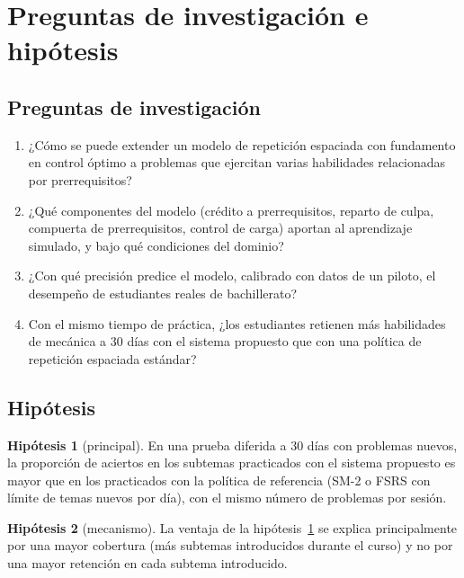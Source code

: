\documentclass[12pt]{article}
\theoremstyle{definition}
\newtheorem{hipotesis}{Hipótesis}
\begin{document}
\section{Preguntas de investigación e hipótesis}
\label{sec:preguntas}

\subsection{Preguntas de investigación}

\begin{enumerate}[label=P\arabic*.]
\item ¿Cómo se puede extender un modelo de repetición espaciada con fundamento en control óptimo \citep{tabibian2019} a problemas que ejercitan varias habilidades relacionadas por prerrequisitos?
\item ¿Qué componentes del modelo (crédito a prerrequisitos, reparto de culpa, compuerta de prerrequisitos, control de carga) aportan al aprendizaje simulado, y bajo qué condiciones del dominio?
\item ¿Con qué precisión predice el modelo, calibrado con datos de un piloto, el desempeño de estudiantes reales de bachillerato?
\item Con el mismo tiempo de práctica, ¿los estudiantes retienen más habilidades de mecánica a 30 días con el sistema propuesto que con una política de repetición espaciada estándar?
\end{enumerate}

\subsection{Hipótesis}

\begin{hipotesis}[principal]
\label{h:principal}
En una prueba diferida a 30 días con problemas nuevos, la proporción de aciertos en los subtemas practicados con el sistema propuesto es mayor que en los practicados con la política de referencia (SM-2 o FSRS con límite de temas nuevos por día), con el mismo número de problemas por sesión.
\end{hipotesis}

\begin{hipotesis}[mecanismo]
\label{h:mecanismo}
La ventaja de la hipótesis~\ref{h:principal} se explica principalmente por una mayor cobertura (más subtemas introducidos durante el curso) y no por una mayor retención en cada subtema introducido.
\end{hipotesis}
\end{document}
